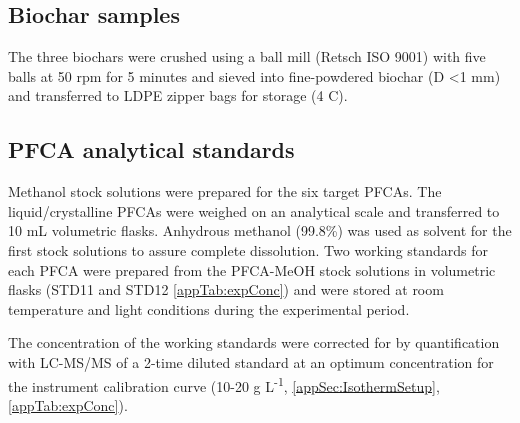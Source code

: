\subsection{Biochar samples}
The three biochars were crushed using a ball mill (Retsch ISO 9001) with five balls at 50 rpm for 5 minutes and sieved into fine-powdered biochar (D \textless 1 mm) and transferred to LDPE zipper bags for storage (4 \textdegree C). 

\subsection{PFCA analytical standards}\label{ssec:PFCAanalytic}
Methanol stock solutions were prepared for the six target PFCAs. The liquid/crystalline PFCAs were weighed on an analytical scale and transferred to 10 mL volumetric flasks. Anhydrous methanol (99.8\%) was used as solvent for the first stock solutions to assure complete dissolution. Two working standards for each PFCA were prepared from the PFCA-MeOH stock solutions in volumetric flasks (STD11 and STD12 \cref{appTab:expConc}) and were stored at room temperature and light conditions during the experimental period. 

The concentration of the working standards were corrected for by quantification with LC-MS/MS of a 2-time diluted standard at an optimum concentration for the instrument calibration curve (10-20 \textmu g L\textsuperscript{-1}, \cref{appSec:IsothermSetup}, \cref{appTab:expConc}).

\begin{table}
    \caption{Spike concentrations for each PFCA batch test.}
    \label{tab:concentrations}
\end{table}

